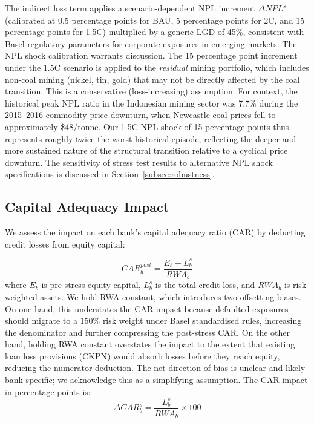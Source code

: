 The indirect loss term applies a scenario-dependent NPL increment $\Delta NPL^s$ (calibrated at 0.5 percentage points for BAU, 5 percentage points for 2\textdegree C, and 15 percentage points for 1.5\textdegree C) multiplied by a generic LGD of 45\%, consistent with Basel regulatory parameters for corporate exposures in emerging markets. The NPL shock calibration warrants discussion. The 15 percentage point increment under the 1.5\textdegree C scenario is applied to the \textit{residual} mining portfolio, which includes non-coal mining (nickel, tin, gold) that may not be directly affected by the coal transition. This is a conservative (loss-increasing) assumption. For context, the historical peak NPL ratio in the Indonesian mining sector was 7.7\% during the 2015--2016 commodity price downturn, when Newcastle coal prices fell to approximately \$48/tonne. Our 1.5\textdegree C NPL shock of 15 percentage points thus represents roughly twice the worst historical episode, reflecting the deeper and more sustained nature of the structural transition relative to a cyclical price downturn. The sensitivity of stress test results to alternative NPL shock specifications is discussed in Section~\ref{subsec:robustness}.

\subsection{Capital Adequacy Impact}
\label{subsec:capital_adequacy}

We assess the impact on each bank's capital adequacy ratio (CAR) by deducting credit losses from equity capital:

\begin{equation}
\label{eq:car_impact}
CAR_b^{post} = \frac{E_b - L_b^s}{RWA_b}
\end{equation}
where $E_b$ is pre-stress equity capital, $L_b^s$ is the total credit loss, and $RWA_b$ is risk-weighted assets. We hold RWA constant, which introduces two offsetting biases. On one hand, this understates the CAR impact because defaulted exposures should migrate to a 150\% risk weight under Basel standardised rules, increasing the denominator and further compressing the post-stress CAR. On the other hand, holding RWA constant overstates the impact to the extent that existing loan loss provisions (CKPN) would absorb losses before they reach equity, reducing the numerator deduction. The net direction of bias is unclear and likely bank-specific; we acknowledge this as a simplifying assumption. The CAR impact in percentage points is:
\begin{equation}
\label{eq:car_delta}
\Delta CAR_b^s = \frac{L_b^s}{RWA_b} \times 100
\end{equation}

